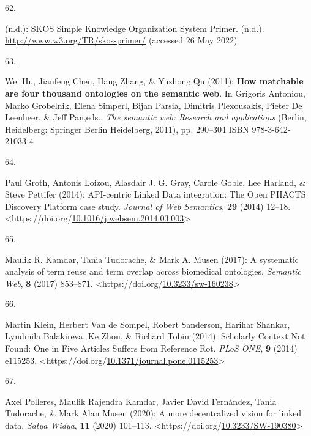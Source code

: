 \begin{thebibliography}{9}
\hypertarget{ref-w3-skos-primer}{}
62.

(n.d.): {SKOS Simple Knowledge Organization System Primer}. (n.d.).
\url{http://www.w3.org/TR/skos-primer/} (accessed 26 May 2022)

\hypertarget{ref-huHowMatchableAre2011a}{}
63.

Wei Hu, Jianfeng Chen, Hang Zhang, \& Yuzhong Qu (2011): \textbf{How
matchable are four thousand ontologies on the semantic web}. In Grigoris
Antoniou, Marko Grobelnik, Elena Simperl, Bijan Parsia, Dimitris
Plexousakis, Pieter De Leenheer, \& Jeff Pan,eds., \emph{The semantic
web: {Research} and applications} ({Berlin, Heidelberg}: {Springer
Berlin Heidelberg}, 2011), pp. 290--304 ISBN 978-3-642-21033-4

\hypertarget{ref-grothAPIcentricLinkedData2014b}{}
64.

Paul Groth, Antonis Loizou, Alasdair J. G. Gray, Carole Goble, Lee
Harland, \& Steve Pettifer (2014): {API-centric Linked Data}
integration: {The Open PHACTS Discovery Platform} case study.
\emph{Journal of Web Semantics}, \textbf{29} (2014) 12--18.
\textless https://doi.org/\href{https://doi.org/10.1016/j.websem.2014.03.003}{10.1016/j.websem.2014.03.003}\textgreater{}

\hypertarget{ref-kamdarSystematicAnalysisTerm2017a}{}
65.

Maulik R. Kamdar, Tania Tudorache, \& Mark A. Musen (2017): A systematic
analysis of term reuse and term overlap across biomedical ontologies.
\emph{Semantic Web}, \textbf{8} (2017) 853--871.
\textless https://doi.org/\href{https://doi.org/10.3233/sw-160238}{10.3233/sw-160238}\textgreater{}

\hypertarget{ref-kleinScholarlyContextNot2014a}{}
66.

Martin Klein, Herbert Van de Sompel, Robert Sanderson, Harihar Shankar,
Lyudmila Balakireva, Ke Zhou, \& Richard Tobin (2014): Scholarly
{Context Not Found}: {One} in {Five Articles Suffers} from {Reference
Rot}. \emph{PLoS ONE}, \textbf{9} (2014) e115253.
\textless https://doi.org/\href{https://doi.org/10.1371/journal.pone.0115253}{10.1371/journal.pone.0115253}\textgreater{}

\hypertarget{ref-polleresMoreDecentralizedVision2020a}{}
67.

Axel Polleres, Maulik Rajendra Kamdar, Javier David Fernández, Tania
Tudorache, \& Mark Alan Musen (2020): A more decentralized vision for
linked data. \emph{Satya Widya}, \textbf{11} (2020) 101--113.
\textless https://doi.org/\href{https://doi.org/10.3233/SW-190380}{10.3233/SW-190380}\textgreater{}


\end{thebibliography}
